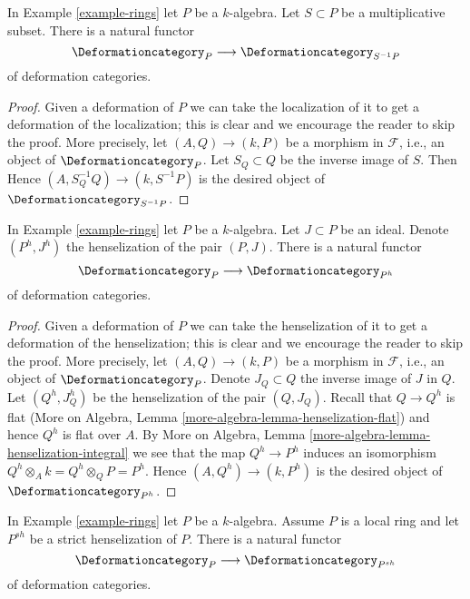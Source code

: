 \begin{lemma}
\label{lemma-localization}
In Example \ref{example-rings} let $P$ be a $k$-algebra.
Let $S \subset P$ be a multiplicative subset. There is a natural functor
$$
\Deformationcategory_P \longrightarrow \Deformationcategory_{S^{-1}P}
$$
of deformation categories.
\end{lemma}

\begin{proof}
Given a deformation of $P$ we can take the localization
of it to get a deformation of the localization; this is
clear and we encourage the reader to skip the proof. More precisely,
let $(A, Q) \to (k, P)$ be a morphism in $\mathcal{F}$, i.e.,
an object of $\Deformationcategory_P$. Let $S_Q \subset Q$ be the
inverse image of $S$. Then
Hence $(A, S_Q^{-1}Q) \to (k, S^{-1}P)$
is the desired object of $\Deformationcategory_{S^{-1}P}$.
\end{proof}

\begin{lemma}
\label{lemma-henselization}
In Example \ref{example-rings} let $P$ be a $k$-algebra.
Let $J \subset P$ be an ideal.
Denote $(P^h, J^h)$ the henselization of the pair $(P, J)$.
There is a natural functor
$$
\Deformationcategory_P \longrightarrow \Deformationcategory_{P^h}
$$
of deformation categories.
\end{lemma}

\begin{proof}
Given a deformation of $P$ we can take the henselization
of it to get a deformation of the henselization; this is
clear and we encourage the reader to skip the proof. More precisely,
let $(A, Q) \to (k, P)$ be a morphism in $\mathcal{F}$, i.e.,
an object of $\Deformationcategory_P$. Denote $J_Q \subset Q$ the inverse
image of $J$ in $Q$. Let $(Q^h, J_Q^h)$ be the henselization of
the pair $(Q, J_Q)$. Recall that $Q \to Q^h$ is flat
(More on Algebra, Lemma \ref{more-algebra-lemma-henselization-flat})
and hence $Q^h$ is flat over $A$.
By More on Algebra, Lemma \ref{more-algebra-lemma-henselization-integral}
we see that the map $Q^h \to P^h$ induces an isomorphism
$Q^h \otimes_A k = Q^h \otimes_Q P = P^h$.
Hence $(A, Q^h) \to (k, P^h)$ is the desired object of
$\Deformationcategory_{P^h}$.
\end{proof}

\begin{lemma}
\label{lemma-strict-henselization}
In Example \ref{example-rings} let $P$ be a $k$-algebra.
Assume $P$ is a local ring and let $P^{sh}$ be a strict henselization of $P$.
There is a natural functor
$$
\Deformationcategory_P \longrightarrow \Deformationcategory_{P^{sh}}
$$
of deformation categories.
\end{lemma}

